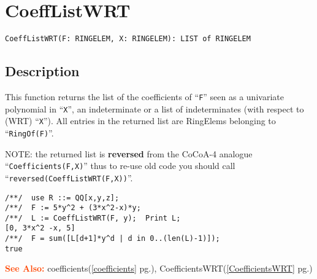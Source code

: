 \documentclass[a4paper]{mybook}
\newenvironment{command}{}{} %
\newcommand\SeeAlso{\par\textcolor{OrangeRed}{\textbf{\large See Also: }}}
\begin{document}
\section{CoeffListWRT}
\label{CoeffListWRT}
\begin{command} %


\begin{Verbatim}[label=syntax, rulecolor=\color{MidnightBlue},
frame=single]
CoeffListWRT(F: RINGELEM, X: RINGELEM): LIST of RINGELEM
\end{Verbatim}


\subsection*{Description}

This function returns the list of the coefficients of ``\verb&F&'' seen as a univariate
polynomial in ``\verb&X&'', an indeterminate or a list of indeterminates
(with respect to (WRT) ``\verb&X&'').
All entries in the returned list are RingElems belonging to ``\verb&RingOf(F)&''.
\par 
NOTE: the returned list is \textbf{reversed} from the CoCoA-4 analogue
``\verb&Coefficients(F,X)&'' thus to re-use old code you should call
``\verb&reversed(CoeffListWRT(F,X))&''.
\begin{Verbatim}[label=example, rulecolor=\color{PineGreen}, frame=single]
/**/  use R ::= QQ[x,y,z];
/**/  F := 5*y^2 + (3*x^2-x)*y;
/**/  L := CoeffListWRT(F, y);  Print L;
[0, 3*x^2 -x, 5]
/**/  F = sum([L[d+1]*y^d | d in 0..(len(L)-1)]);
true
\end{Verbatim}


\SeeAlso %
  coefficients(\ref{coefficients} pg.\pageref{coefficients}), 
    CoefficientsWRT(\ref{CoefficientsWRT} pg.\pageref{CoefficientsWRT})
\end{command} %
\end{document}
